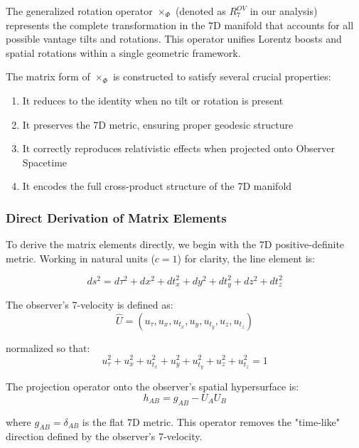 \documentclass{article}
\begin{document}
The generalized rotation operator $\times_\Phi$ (denoted as $R^{OV}_7$ in our analysis) represents the complete transformation in the 7D manifold that accounts for all possible vantage tilts and rotations. This operator unifies Lorentz boosts and spatial rotations within a single geometric framework.

The matrix form of $\times_\Phi$ is constructed to satisfy several crucial properties:

\begin{enumerate}
\item It reduces to the identity when no tilt or rotation is present
\item It preserves the 7D metric, ensuring proper geodesic structure
\item It correctly reproduces relativistic effects when projected onto Observer Spacetime
\item It encodes the full cross-product structure of the 7D manifold
\end{enumerate}

\subsubsection{Direct Derivation of Matrix Elements}

To derive the matrix elements directly, we begin with the 7D positive-definite metric. Working in natural units ($c = 1$) for clarity, the line element is:

\begin{equation}
ds^2 = d\tau^2 + dx^2 + dt_x^2 + dy^2 + dt_y^2 + dz^2 + dt_z^2
\end{equation}

The observer's 7-velocity is defined as:
\begin{equation}
\hat{U} = (u_\tau, u_x, u_{t_x}, u_y, u_{t_y}, u_z, u_{t_z})
\end{equation}

normalized so that:
\begin{equation}
u_\tau^2 + u_x^2 + u_{t_x}^2 + u_y^2 + u_{t_y}^2 + u_z^2 + u_{t_z}^2 = 1
\end{equation}

The projection operator onto the observer's spatial hypersurface is:
\begin{equation}
h_{AB} = g_{AB} - U_A U_B
\end{equation}

where $g_{AB} = \delta_{AB}$ is the flat 7D metric. This operator removes the "time-like" direction defined by the observer's 7-velocity.
\end{document}
